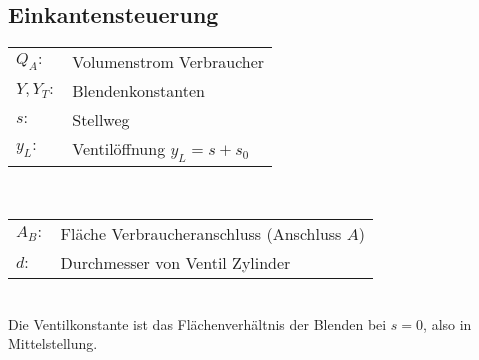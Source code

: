 \subsection{Einkantensteuerung}


\begin{tabular}{ll}
$Q_A:$ & Volumenstrom Verbraucher \\
$Y, Y_T:$ & Blendenkonstanten \\
$s:$ & Stellweg \\
$y_L:$  & Ventilöffnung $y_L = s + s_0$
\end{tabular} \\





\begin{tabular}{ll}
$A_B:$ & Fläche Verbraucheranschluss (Anschluss $A$)  \\
$d:$ & Durchmesser von Ventil Zylinder
\end{tabular} \\

Die Ventilkonstante ist das Flächenverhältnis der Blenden bei $s=0$, also in Mittelstellung. 





